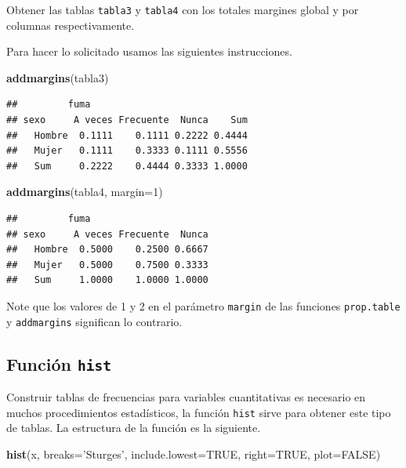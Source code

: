 \documentclass[10pt,]{krantz}
\makeatletter
\newenvironment{Shaded}{\begin{snugshade}}{\end{snugshade}}
\newcommand{\KeywordTok}[1]{\textcolor[rgb]{0.13,0.29,0.53}{\textbf{#1}}}
\newcommand{\DataTypeTok}[1]{\textcolor[rgb]{0.13,0.29,0.53}{#1}}
\newcommand{\DecValTok}[1]{\textcolor[rgb]{0.00,0.00,0.81}{#1}}
\newcommand{\StringTok}[1]{\textcolor[rgb]{0.31,0.60,0.02}{#1}}
\newcommand{\OtherTok}[1]{\textcolor[rgb]{0.56,0.35,0.01}{#1}}
\newcommand{\NormalTok}[1]{#1}
\newenvironment{kframe}{%
\medskip{}
\setlength{\fboxsep}{.8em}
 \def\at@end@of@kframe{}%
 \ifinner\ifhmode%
  \def\at@end@of@kframe{\end{minipage}}%
  \begin{minipage}{\columnwidth}%
 \fi\fi%
 \def\FrameCommand##1{\hskip\@totalleftmargin \hskip-\fboxsep
 \colorbox{shadecolor}{##1}\hskip-\fboxsep
     \hskip-\linewidth \hskip-\@totalleftmargin \hskip\columnwidth}%
 \MakeFramed {\advance\hsize-\width
   \@totalleftmargin\z@ \linewidth\hsize
   \@setminipage}}%
 {\par\unskip\endMakeFramed%
 \at@end@of@kframe}
\renewenvironment{Shaded}{\begin{kframe}}{\end{kframe}}
\let\BeginKnitrBlock\begin \let\EndKnitrBlock\end
\makeatother
\begin{document}
Obtener las tablas \texttt{tabla3} y \texttt{tabla4} con los totales
margines global y por columnas respectivamente.

Para hacer lo solicitado usamos las siguientes instrucciones.

\begin{Shaded}
\begin{Highlighting}[]
\KeywordTok{addmargins}\NormalTok{(tabla3)}
\end{Highlighting}
\end{Shaded}

\begin{verbatim}
##         fuma
## sexo     A veces Frecuente  Nunca    Sum
##   Hombre  0.1111    0.1111 0.2222 0.4444
##   Mujer   0.1111    0.3333 0.1111 0.5556
##   Sum     0.2222    0.4444 0.3333 1.0000
\end{verbatim}

\begin{Shaded}
\begin{Highlighting}[]
\KeywordTok{addmargins}\NormalTok{(tabla4, }\DataTypeTok{margin=}\DecValTok{1}\NormalTok{)}
\end{Highlighting}
\end{Shaded}

\begin{verbatim}
##         fuma
## sexo     A veces Frecuente  Nunca
##   Hombre  0.5000    0.2500 0.6667
##   Mujer   0.5000    0.7500 0.3333
##   Sum     1.0000    1.0000 1.0000
\end{verbatim}

\BeginKnitrBlock{rmdwarning}
Note que los valores de 1 y 2 en el parámetro \texttt{margin} de las
funciones \texttt{prop.table} y \texttt{addmargins} significan lo
contrario.
\EndKnitrBlock{rmdwarning}

\subsection{\texorpdfstring{Función \texttt{hist}
}{Función hist }}\label{funcion-hist}

Construir tablas de frecuencias para variables cuantitativas es
necesario en muchos procedimientos estadísticos, la función
\texttt{hist} sirve para obtener este tipo de tablas. La estructura de
la función es la siguiente.

\begin{Shaded}
\begin{Highlighting}[]
\KeywordTok{hist}\NormalTok{(x, }\DataTypeTok{breaks=}\StringTok{'Sturges'}\NormalTok{, }\DataTypeTok{include.lowest=}\OtherTok{TRUE}\NormalTok{, }\DataTypeTok{right=}\OtherTok{TRUE}\NormalTok{, }
     \DataTypeTok{plot=}\OtherTok{FALSE}\NormalTok{)}
\end{Highlighting}
\end{Shaded}
\end{document}

